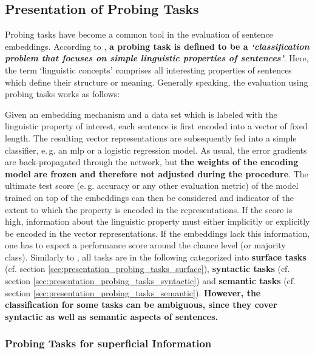 \subsection{Presentation of Probing Tasks}
\label{sec:probing_tasks_presentation}

Probing tasks have become a common tool in the evaluation of sentence embeddings. According to \citep{Conneau.2018a}, \textbf{a probing task is defined to be a \textit{`classification problem that focuses on simple linguistic properties of sentences'}}. Here, the term `linguistic concepts' comprises all interesting properties of sentences which define their structure or meaning. Generally speaking, the evaluation using probing tasks works as follows:

Given an embedding mechanism and a data set which is labeled with the linguistic property of interest, each sentence is first encoded into a vector of fixed length. The resulting vector representations are subsequently fed into a simple classifier, e.\,g. an \gls{mlp} or a logistic regression model. As usual, the error gradients are back-propagated through the network, but \textbf{the weights of the encoding model are frozen and therefore not adjusted during the procedure}. The ultimate test score (e.\,g. accuracy or any other evaluation metric) of the model trained on top of the embeddings can then be considered and indicator of the extent to which the property is encoded in the representations. If the score is high, information about the linguistic property must either implicitly or explicitly be encoded in the vector representations. If the embeddings lack this information, one has to expect a performance score around the chance level (or majority class). Similarly to \citep{Conneau.2018a}, all tasks are in the following categorized into \textbf{surface tasks} (cf. section  \vref{sec:presentation_probing_tasks_surface}), \textbf{syntactic tasks} (cf. section \vref{sec:presentation_probing_tasks_syntactic}) and \textbf{semantic tasks} (cf. section \vref{sec:presentation_probing_tasks_semantic}). \textbf{However, the classification for some tasks can be ambiguous, since they cover syntactic as well as semantic aspects of sentences.} 

\subsubsection{Probing Tasks for superficial Information}
\label{sec:presentation_probing_tasks_surface}

